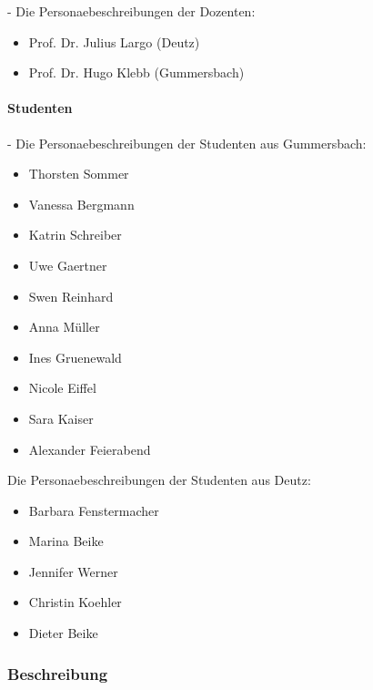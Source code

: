   - Die Personaebeschreibungen der Dozenten:

\begin{itemize}

	\item Prof. Dr. Julius Largo (Deutz)
	\item Prof. Dr. Hugo Klebb (Gummersbach)

\end{itemize}



\paragraph{Studenten} %
\label{par:studenten}

  - Die Personaebeschreibungen der Studenten aus Gummersbach:

\begin{itemize}

	\item   Thorsten Sommer
	\item   Vanessa Bergmann
	\item   Katrin Schreiber
	\item   Uwe Gaertner
	\item   Swen Reinhard
	\item   Anna Müller
	\item   Ines Gruenewald
	\item   Nicole Eiffel
	\item   Sara Kaiser
	\item   Alexander Feierabend

\end{itemize}

Die Personaebeschreibungen der Studenten aus Deutz:

\begin{itemize}

	\item   Barbara Fenstermacher
	\item   Marina Beike
	\item   Jennifer Werner
	\item   Christin Koehler
	\item   Dieter Beike

\end{itemize}



\subsubsection{Beschreibung} %
\label{ssub:beschreibung}

